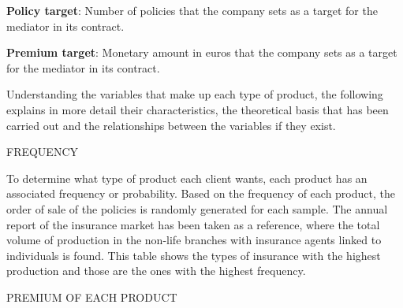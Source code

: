 \documentclass[review]{elsarticle}
\begin{document}
\textbf{Policy target}: Number of policies that the company sets as a target for the mediator in its contract.

\textbf{Premium target}: Monetary amount in euros that the company sets as a target for the mediator in its contract.

Understanding the variables that make up each type of product, the following explains in more detail their characteristics, the theoretical basis that has been carried out and the relationships between the variables if they exist.

FREQUENCY

To determine what type of product each client wants, each product has an associated frequency or probability. Based on the frequency of each product, the order of sale of the policies is randomly generated for each sample.
The annual report of the insurance market \cite{dgsfp2022informe} has been taken as a reference, where the total volume of production in the non-life branches with insurance agents linked to individuals is found. This table shows the types of insurance with the highest production and those are the ones with the highest frequency.

PREMIUM OF EACH PRODUCT
\end{document}
